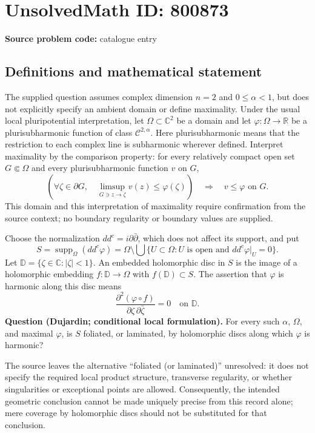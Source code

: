 \documentclass[11pt]{article}
\newcommand{\R}{\mathbb{R}}
\newcommand{\C}{\mathbb{C}}
\begin{document}
\section*{UnsolvedMath ID: 800873}
\textbf{Source problem code:} catalogue entry
\subsection{Definitions and mathematical statement}
The supplied question assumes complex dimension \(n=2\) and \(0\leq\alpha<1\), but does not explicitly specify an ambient domain or define maximality. Under the usual local pluripotential interpretation, let \(\Omega\subset\C^2\) be a domain and let \(\varphi\colon\Omega\to\R\) be a plurisubharmonic function of class \(\mathcal C^{2,\alpha}\). Here plurisubharmonic means that the restriction to each complex line is subharmonic wherever defined. Interpret maximality by the comparison property: for every relatively compact open set \(G\Subset\Omega\) and every plurisubharmonic function \(v\) on \(G\),
\[
\left(\forall\zeta\in\partial G,\quad \limsup_{G\ni z\to\zeta}v(z)\leq\varphi(\zeta)\right)
\quad\Longrightarrow\quad
v\leq\varphi\text{ on }G.
\]
This domain and this interpretation of maximality require confirmation from the source context; no boundary regularity or boundary values are supplied.

Choose the normalization \(dd^c=i\partial\bar\partial\), which does not affect its support, and put
\[
S=\operatorname{supp}_{\Omega}(dd^c\varphi)
=\Omega\setminus\bigcup\{U\subset\Omega: U\text{ is open and }dd^c\varphi|_U=0\}.
\]
Let \(\mathbb D=\{\zeta\in\C:|\zeta|<1\}\). An embedded holomorphic disc in \(S\) is the image of a holomorphic embedding \(f\colon\mathbb D\to\Omega\) with \(f(\mathbb D)\subset S\). The assertion that \(\varphi\) is harmonic along this disc means
\[
\frac{\partial^2(\varphi\circ f)}{\partial\zeta\,\partial\bar\zeta}=0
\quad\text{on }\mathbb D.
\]
\textbf{Question (Dujardin; conditional local formulation).} For every such \(\alpha\), \(\Omega\), and maximal \(\varphi\), is \(S\) foliated, or laminated, by holomorphic discs along which \(\varphi\) is harmonic?

The source leaves the alternative ``foliated (or laminated)'' unresolved: it does not specify the required local product structure, transverse regularity, or whether singularities or exceptional points are allowed. Consequently, the intended geometric conclusion cannot be made uniquely precise from this record alone; mere coverage by holomorphic discs should not be substituted for that conclusion.
\end{document}
